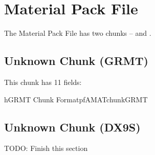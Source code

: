\section{Material Pack File}
\label{sec:pfAMAT}

The Material Pack File has two chunks --  and
.

\subsection{Unknown Chunk (GRMT)}
\label{subsec:pfAMATchunkGRMT}

This chunk has 11 fields:

\begin{datastructure}{h}{GRMT Chunk Format}{pfAMATchunkGRMT}
\end{datastructure}

\subsection{Unknown Chunk (DX9S)}
\label{subsec:pfAMATchunkDX9S}

TODO: Finish this section



